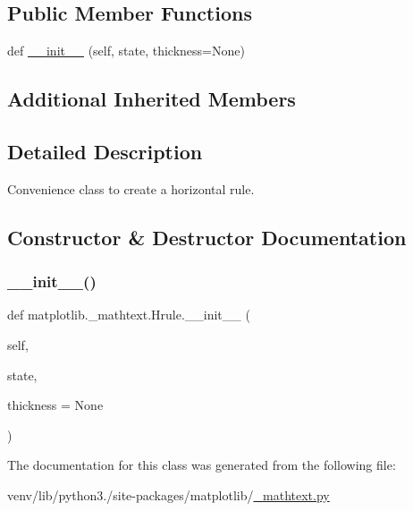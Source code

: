 \subsection*{Public Member Functions}
\begin{DoxyCompactItemize}
\item 
def \hyperlink{classmatplotlib_1_1__mathtext_1_1Hrule_a463132f207e005ff20c83586157aaa1d}{\+\_\+\+\_\+init\+\_\+\+\_\+} (self, state, thickness=None)
\end{DoxyCompactItemize}
\subsection*{Additional Inherited Members}


\subsection{Detailed Description}
\begin{DoxyVerb}Convenience class to create a horizontal rule.\end{DoxyVerb}
 

\subsection{Constructor \& Destructor Documentation}
\mbox{\label{classmatplotlib_1_1__mathtext_1_1Hrule_a463132f207e005ff20c83586157aaa1d}} 
\subsubsection{\texorpdfstring{\+\_\+\+\_\+init\+\_\+\+\_\+()}{\_\_init\_\_()}}
{\footnotesize\ttfamily def matplotlib.\+\_\+mathtext.\+Hrule.\+\_\+\+\_\+init\+\_\+\+\_\+ (\begin{DoxyParamCaption}\item[{}]{self,  }\item[{}]{state,  }\item[{}]{thickness = {\ttfamily None} }\end{DoxyParamCaption})}



The documentation for this class was generated from the following file\+:\begin{DoxyCompactItemize}
\item 
venv/lib/python3./site-\/packages/matplotlib/\hyperlink{__mathtext_8py}{\+\_\+mathtext.\+py}\end{DoxyCompactItemize}
